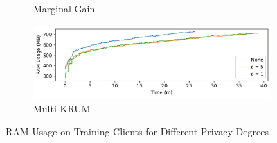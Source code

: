 \begin{figure}[!ht]
\begin{subfigure}[b]{0.49\textwidth}
        \caption{Marginal Gain}
    \end{subfigure}
    \hfill
    \begin{subfigure}[b]{0.49\textwidth}
        \centering
        \includegraphics[width=\textwidth]{graphics/05_priv_ram_multikrum_client.pdf}
        \caption{Multi-KRUM}
    \end{subfigure}
    \caption{RAM Usage on Training Clients for Different Privacy Degrees}
    \label{fig:ram_priv_degree_clients}
\end{figure}

